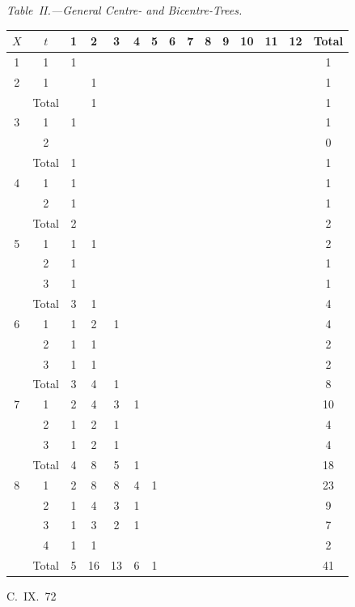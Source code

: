 \documentclass[11pt,a4paper]{article}
\begin{document}
{\textit{Table~II.---General Centre- and Bicentre-Trees.}
\begin{center}
\small
\begin{longtable}{|c|c|c|c|c|c|c|c|c|c|c|c|c|c|c|}
\hline
$X$ & $t$ & 1 & 2 & 3 & 4 & 5 & 6 & 7 & 8 & 9 & 10 & 11 & 12 & Total \\
\hline
\endfirsthead
1 & 1 & 1 & & & & & & & & & & & & 1 \\
\hline
2 & 1 & & 1 & & & & & & & & & & & 1 \\
  & Total & & 1 & & & & & & & & & & & 1 \\
\hline
3 & 1 & 1 & & & & & & & & & & & & 1 \\
  & 2 & & & & & & & & & & & & & 0 \\
  & Total & 1 & & & & & & & & & & & & 1 \\
\hline
4 & 1 & 1 & & & & & & & & & & & & 1 \\
  & 2 & 1 & & & & & & & & & & & & 1 \\
  & Total & 2 & & & & & & & & & & & & 2 \\
\hline
5 & 1 & 1 & 1 & & & & & & & & & & & 2 \\
  & 2 & 1 & & & & & & & & & & & & 1 \\
  & 3 & 1 & & & & & & & & & & & & 1 \\
  & Total & 3 & 1 & & & & & & & & & & & 4 \\
\hline
6 & 1 & 1 & 2 & 1 & & & & & & & & & & 4 \\
  & 2 & 1 & 1 & & & & & & & & & & & 2 \\
  & 3 & 1 & 1 & & & & & & & & & & & 2 \\
  & Total & 3 & 4 & 1 & & & & & & & & & & 8 \\
\hline
7 & 1 & 2 & 4 & 3 & 1 & & & & & & & & & 10 \\
  & 2 & 1 & 2 & 1 & & & & & & & & & & 4 \\
  & 3 & 1 & 2 & 1 & & & & & & & & & & 4 \\
  & Total & 4 & 8 & 5 & 1 & & & & & & & & & 18 \\
\hline
8 & 1 & 2 & 8 & 8 & 4 & 1 & & & & & & & & 23 \\
  & 2 & 1 & 4 & 3 & 1 & & & & & & & & & 9 \\
  & 3 & 1 & 3 & 2 & 1 & & & & & & & & & 7 \\
  & 4 & 1 & 1 & & & & & & & & & & & 2 \\
  & Total & 5 & 16 & 13 & 6 & 1 & & & & & & & & 41 \\
\hline
\end{longtable}
\end{center}
\hfill C.~IX.\ 72

}
\end{document}
